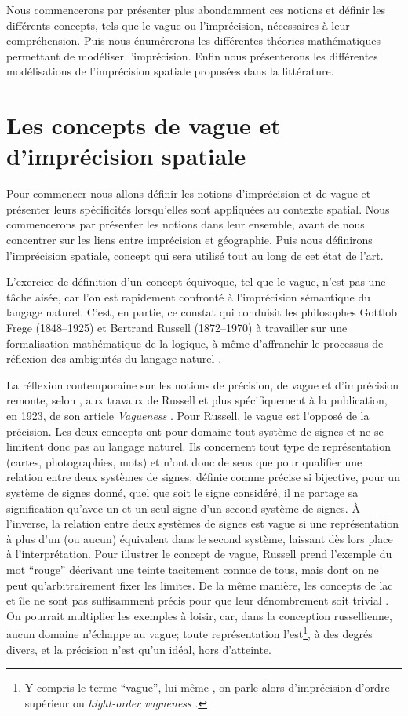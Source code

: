 Nous commencerons par présenter plus abondamment ces notions et
définir les différents concepts, tels que le vague ou l’imprécision,
nécessaires à leur compréhension. Puis nous énumérerons les
différentes théories mathématiques permettant de modéliser
l’imprécision. Enfin nous présenterons les différentes modélisations
de l’imprécision spatiale proposées dans la littérature.

\section{Les concepts de vague et d’imprécision spatiale}

Pour commencer nous allons définir les notions d’imprécision et de
vague et présenter leurs spécificités lorsqu’elles sont appliquées au
contexte spatial. Nous commencerons par présenter les notions dans
leur ensemble, avant de nous concentrer sur les liens entre
imprécision et géographie. Puis nous définirons l’imprécision
spatiale, concept qui sera utilisé tout au long de cet état de l’art.

L’exercice de définition d’un concept équivoque, tel que le vague,
n’est pas une tâche aisée, car l’on est rapidement confronté à
l’imprécision sémantique du langage naturel. C’est, en partie, ce
constat qui conduisit les philosophes Gottlob Frege (1848–1925) et
Bertrand Russell (1872–1970) à travailler sur une formalisation
mathématique de la logique, à même d’affranchir le processus de
réflexion des ambiguïtés du langage naturel \autocite{Williamson1994}.

La réflexion contemporaine sur les notions de précision, de vague et
d’imprécision remonte, selon \textcite{Williamson1994}, aux travaux de
Russell et plus spécifiquement à la publication, en 1923, de son
article \emph{Vagueness} \autocite{Russell1923}. Pour Russell, le
vague est l’opposé de la précision. Les deux concepts ont pour domaine
tout système de signes et ne se limitent donc pas au langage
naturel. Ils concernent tout type de représentation (\eg cartes,
photographies, mots) et n’ont donc de sens que pour qualifier une
relation entre deux systèmes de signes, définie comme précise si
bijective, \ie pour un système de signes donné, quel que soit le signe
considéré, il ne partage sa signification qu’avec un et un seul signe
d’un second système de signes. À l’inverse, la relation entre deux
systèmes de signes est vague si une représentation à plus d’un (ou
aucun) équivalent dans le second système, laissant dès lors place à
l’interprétation. Pour illustrer le concept de vague, Russell prend
l’exemple du mot \enquote{rouge} décrivant une teinte tacitement
connue de tous, mais dont on ne peut qu’arbitrairement fixer les
limites. De la même manière, les concepts de lac et île ne sont pas
suffisamment précis pour que leur dénombrement soit trivial
\autocite{Sarjakoski1996}. On pourrait multiplier les exemples à
loisir, car, dans la conception russellienne, aucun domaine n’échappe
au vague; toute représentation l’est\footnote{Y compris le terme
  \enquote{vague}, lui-même \autocite{Russell1923}, on parle alors
  d’imprécision d’ordre supérieur ou \emph{hight-order vagueness}
  \autocite{Williamson1994, Varzi2003}.}, à des degrés divers, et la
précision n’est qu’un idéal, hors d’atteinte.

